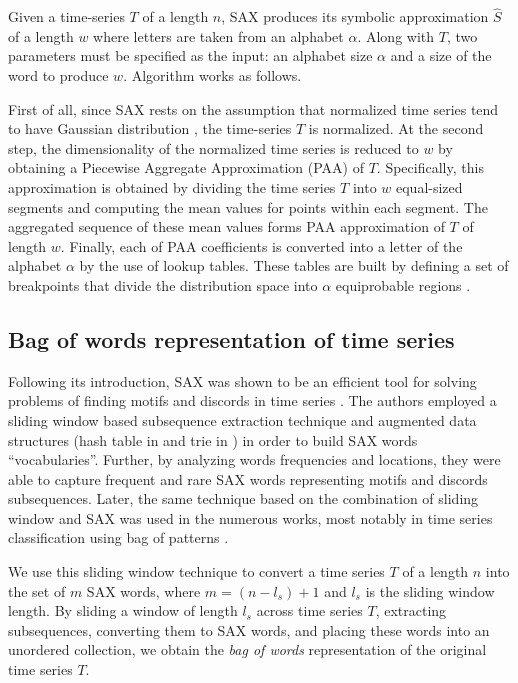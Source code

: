\documentclass{llncs}
\begin{document}
Given a time-series $T$ of a length $n$, SAX produces its symbolic approximation $\hat{S}$ of 
a length $w$ where letters are taken from an alphabet $\alpha$. 
Along with $T$, two parameters must be specified as the input: an alphabet size $\alpha$ and 
a size of the word to produce $w$. Algorithm works as follows. 

First of all, since SAX rests on the assumption that normalized time series tend to have Gaussian 
distribution \cite{larsen_marx}, the time-series $T$ is normalized. 
At the second step, the dimensionality of the normalized time series is reduced to $w$ by 
obtaining a Piecewise Aggregate Approximation (PAA) of $T$. 
Specifically, this approximation is obtained by dividing the time series $T$ into $w$ 
equal-sized segments and computing the mean values for points within each segment. 
The aggregated sequence of these mean values forms PAA approximation of $T$ of length $w$.
Finally, each of PAA coefficients is converted into a letter of the alphabet $\alpha$ by the use 
of lookup tables. These tables are built by defining a set of breakpoints that divide the 
distribution space into $\alpha$ equiprobable regions \cite{sax}.

\subsection{Bag of words representation of time series} \label{bow_representation}
Following its introduction, SAX was shown to be an efficient tool for solving problems 
of finding motifs and discords in time series \cite{motifs, hot_sax}. 
The authors employed a sliding window based subsequence extraction technique 
and augmented data structures (hash table in \cite{motifs} and trie in \cite{hot_sax}) 
in order to build SAX words ``vocabularies''. Further, by analyzing words frequencies 
and locations, they were able to capture frequent and rare SAX words representing 
motifs and discords subsequences. Later, the same technique based on the combination 
of sliding window and SAX was used in the numerous works, most notably in time series 
classification using bag of patterns \cite{bag_patterns}. 

We use this sliding window technique to convert a time series $T$ of a length $n$ into 
the set of $m$ SAX words, where $m=(n-l_{s})+1$ and $l_{s}$ is the sliding window length. 
By sliding a window of length $l_{s}$ across time series $T$, extracting subsequences, 
converting them to SAX words, and placing these words into an unordered collection, 
we obtain the \textit{bag of words} representation of the original time series $T$.
\end{document}
